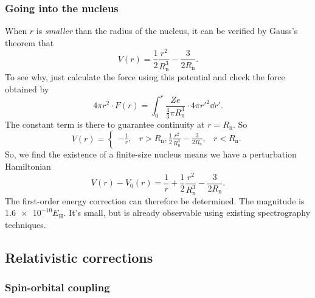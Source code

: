 \documentclass[hyperref, a4paper]{article}
\def\\{}%
\begin{document}
\subsubsection{Going into the nucleus}

When $r$ is \emph{smaller} than the radius of the nucleus, 
it can be verified by Gauss's theorem that 
\begin{equation}
    V(r) = \frac{1}{2} \frac{r^2}{R_{\text{n}}^3} - \frac{3}{2 R_{\text{n}}}.
\end{equation}
To see why, just calculate the force using this potential 
and check the force obtained by 
\begin{equation}
    4 \pi r^2 \cdot F(r) = \int_{0}^{r} \frac{Z e}{\frac{4}{3} \pi R_{\text{n}}^3} \cdot 4 \pi r'^2 \dd{r'}.
\end{equation}
The constant term is there 
to guarantee continuity at $r = R_{\text{n}}$.
So 
\begin{equation}
    V(r) = \begin{cases}
        - \frac{1}{r}, &r > R_{\text{n}}, \\
        \frac{1}{2} \frac{r^2}{R_{\text{n}}^3} - \frac{3}{2 R_{\text{n}}}, & r < R_{\text{n}}.
    \end{cases}
\end{equation}
So, we find the existence of a finite-size nucleus means 
we have a perturbation Hamiltonian 
\begin{equation}
    V(r) - V_0(r) = \frac{1}{r} + \frac{1}{2} \frac{r^2}{R_{\text{n}}^3} - \frac{3}{2 R_{\text{n}}}.
\end{equation}
The first-order energy correction can therefore be determined.
The magnitude is $\num{1.6e-10} E_{\text{H}}$.
It's small, but is already observable using existing spectrography techniques.

\subsection{Relativistic corrections}

\subsubsection{Spin-orbital coupling}
\end{document}
